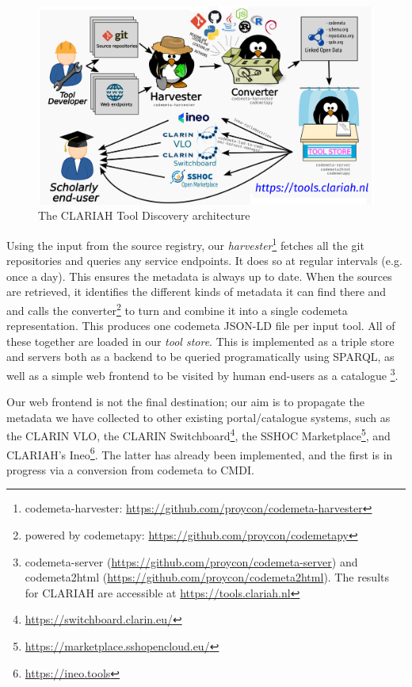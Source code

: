 \documentclass[a4paper,11pt]{article}
\begin{document}
\begin{figure}[h]
\begin{center}
\includegraphics[width=14.0cm]{architecture.png}
\caption{The CLARIAH Tool Discovery architecture}
\end{center}
\label{fig:architecture}
\end{figure}

Using the input from the source registry, our
\emph{harvester}\footnote{codemeta-harvester:
\url{https://github.com/proycon/codemeta-harvester}} fetches all the git
repositories and queries any service endpoints. It does so at regular intervals
(e.g. once a day). This ensures the metadata is always up to date. When the
sources are retrieved, it identifies the different kinds of metadata it can
find there and and calls the converter\footnote{powered by codemetapy:
\url{https://github.com/proycon/codemetapy}} to turn and combine it into a
single codemeta representation. This produces one codemeta JSON-LD file per
input tool. All of these together are loaded in our \emph{tool store}. This is
implemented as a triple store and servers both as a backend to be queried
programatically using SPARQL, as well as a simple web frontend to be visited by
human end-users as a catalogue \footnote{codemeta-server
(\url{https://github.com/proycon/codemeta-server}) and codemeta2html
(\url{https://github.com/proycon/codemeta2html}). The results for CLARIAH are
accessible at \url{https://tools.clariah.nl}}.

Our web frontend is not the final destination; our aim is to propagate the
metadata we have collected to other existing portal/catalogue systems, such as
the CLARIN VLO, the CLARIN
Switchboard\footnote{\url{https://switchboard.clarin.eu/}}, the SSHOC
Marketplace\footnote{\url{https://marketplace.sshopencloud.eu/}}, and CLARIAH's
Ineo\footnote{\url{https://ineo.tools}}. The latter has already been implemented, 
and the first is in progress via a conversion from codemeta to CMDI.
\end{document}
